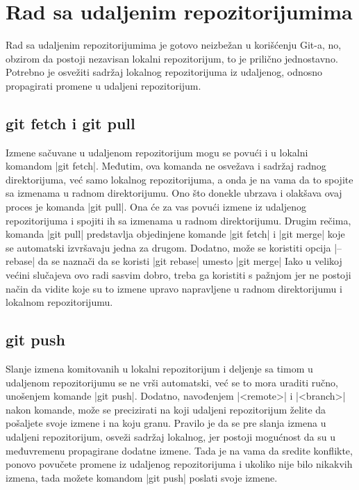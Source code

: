 \documentclass[a4paper]{article}
\begin{document}
{\section{Rad sa udaljenim repozitorijumima}
\label{sec:udaljeni_repozitorijumi}
Rad sa udaljenim repozitorijumima je gotovo neizbežan u korišćenju Git-a, no, obzirom da postoji nezavisan lokalni repozitorijum, to je prilično jednostavno. Potrebno je osvežiti sadržaj lokalnog repozitorijuma iz udaljenog, odnosno propagirati promene u udaljeni repozitorijum.


\subsection{git fetch i git pull}
\label{subsec:git_pull}
Izmene sačuvane u udaljenom repozitorijum mogu se povući i u lokalni komandom |git fetch|. Međutim, ova komanda ne osvežava i sadržaj radnog direktorijuma, već samo lokalnog repozitorijuma, a onda je na vama da to spojite sa izmenama u radnom direktorijumu. Ono što donekle ubrzava i olakšava ovaj proces je komanda |git pull|. Ona će za vas povući izmene iz udaljenog repozitorijuma i spojiti ih sa izmenama u radnom direktorijumu. Drugim rečima, komanda |git pull| predstavlja objedinjene komande |git fetch| i |git merge| koje se automatski izvršavaju jedna za drugom. Dodatno, može se koristiti opcija |--rebase| da se naznači da se koristi |git rebase| umesto |git merge| Iako u velikoj većini slučajeva ovo radi sasvim dobro, treba ga koristiti s pažnjom jer ne postoji način da vidite koje su to izmene upravo napravljene u radnom direktorijumu i lokalnom repozitorijumu.




\subsection{git push}
\label{subsec:git_push}
Slanje izmena komitovanih u lokalni repozitorijum i deljenje sa timom u udaljenom repozitorijumu se ne vrši automatski, već se to mora uraditi ručno, unošenjem komande |git push|. Dodatno, navođenjem |<remote>| i |<branch>| nakon komande, može se precizirati na koji udaljeni repozitorijum želite da pošaljete svoje izmene i na koju granu. Pravilo je da se pre slanja izmena u udaljeni repozitorijum, osveži sadržaj lokalnog, jer postoji mogućnost da su u međuvremenu propagirane dodatne izmene. Tada je na vama da sredite konflikte, ponovo povučete promene iz udaljenog repozitorijuma i ukoliko nije bilo nikakvih izmena, tada možete komandom |git push| poslati svoje izmene.



}
\end{document}
